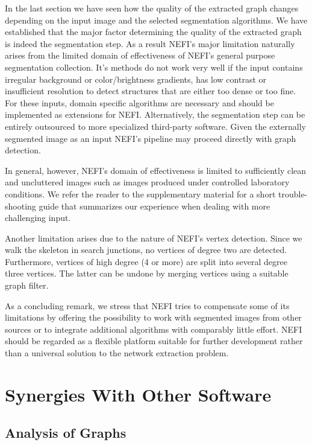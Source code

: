 		In the last section we have seen how the quality of the extracted graph changes depending on the input image and the selected segmentation algorithms. We have established that the major factor determining the quality of the extracted graph is indeed the segmentation step. As a result NEFI's major limitation naturally arises from the limited domain of effectiveness of NEFI's general purpose segmentation collection. It's methods do not work very well if the input contains irregular background or color/brightness gradients, has low contrast or insufficient resolution to detect structures that are either too dense or too fine. For these inputs, domain specific algorithms are necessary and should be implemented as extensions for NEFI. Alternatively, the segmentation step can be entirely outsourced to more specialized third-party software. Given the externally segmented image as an input NEFI's pipeline may proceed directly with graph detection.

		In general, however, NEFI's domain of effectiveness is limited to sufficiently clean and uncluttered images such as images produced under controlled laboratory conditions. We refer the reader to the supplementary material for a short trouble-shooting guide that summarizes our experience when dealing with more challenging input.

		Another limitation arises due to the nature of NEFI's vertex detection. Since we walk the skeleton in search junctions, no vertices of degree two are detected. Furthermore, vertices of high degree (4 or more) are split into several degree three vertices. The latter can be undone by merging vertices using a suitable graph filter.

		As a concluding remark, we stress that NEFI tries to compensate some of its limitations by offering the possibility to work with segmented images from other sources or to integrate additional algorithms with comparably little effort. NEFI should be regarded as a flexible platform suitable for further development rather than a universal solution to the network extraction problem. 

\section{Synergies With Other Software}

	\subsection{Analysis of Graphs}

